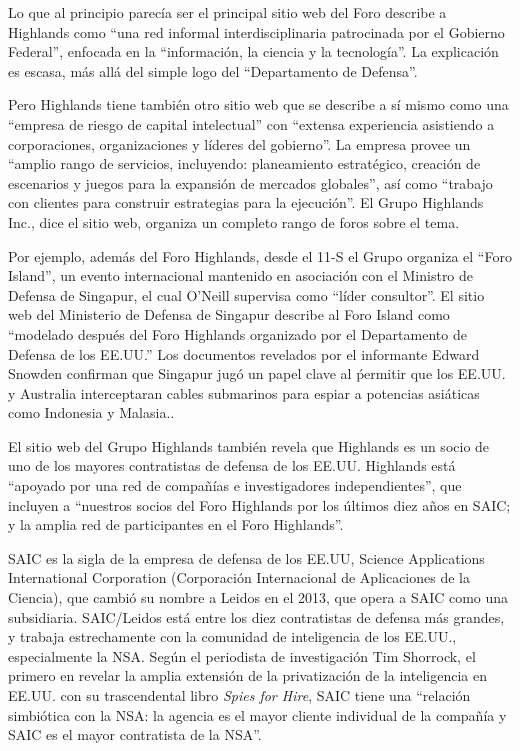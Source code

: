 \documentclass[10pt,a5paper,twoside,spanish,]{book}
\begin{document}
Lo que al principio parecía ser el principal sitio web del Foro describe
a Highlands como ``una red informal interdisciplinaria patrocinada por
el Gobierno Federal'', enfocada en la ``información, la ciencia y la
tecnología''. La explicación es escasa, más allá del simple logo del
``Departamento de Defensa''.

Pero Highlands tiene también otro sitio web que se describe a sí mismo
como una ``empresa de riesgo de capital intelectual'' con ``extensa
experiencia asistiendo a corporaciones, organizaciones y líderes del
gobierno''. La empresa provee un ``amplio rango de servicios,
incluyendo: planeamiento estratégico, creación de escenarios y juegos
para la expansión de mercados globales'', así como ``trabajo con
clientes para construir estrategias para la ejecución''. El Grupo
Highlands Inc., dice el sitio web, organiza un completo rango de foros
sobre el tema.

Por ejemplo, además del Foro Highlands, desde el 11-S el Grupo organiza
el ``Foro Island'', un evento internacional mantenido en asociación con
el Ministro de Defensa de Singapur, el cual O'Neill supervisa como
``líder consultor''. El sitio web del Ministerio de Defensa de Singapur
describe al Foro Island como ``modelado después del Foro Highlands
organizado por el Departamento de Defensa de los EE.UU.'' Los documentos
revelados por el informante Edward Snowden confirman que Singapur jugó
un papel clave al ṕermitir que los EE.UU. y Australia interceptaran
cables submarinos para espiar a potencias asiáticas como Indonesia y
Malasia..

El sitio web del Grupo Highlands también revela que Highlands es un
socio de uno de los mayores contratistas de defensa de los EE.UU.
Highlands está ``apoyado por una red de compañías e investigadores
independientes'', que incluyen a ``nuestros socios del Foro Highlands
por los últimos diez años en SAIC; y la amplia red de participantes en
el Foro Highlands''.

SAIC es la sigla de la empresa de defensa de los EE.UU, Science
Applications International Corporation (Corporación Internacional de
Aplicaciones de la Ciencia), que cambió su nombre a Leidos en el 2013,
que opera a SAIC como una subsidiaria. SAIC/Leidos está entre los diez
contratistas de defensa más grandes, y trabaja estrechamente con la
comunidad de inteligencia de los EE.UU., especialmente la NSA. Según el
periodista de investigación Tim Shorrock, el primero en revelar la
amplia extensión de la privatización de la inteligencia en EE.UU. con su
trascendental libro \emph{Spies for Hire}, SAIC tiene una ``relación
simbiótica con la NSA: la agencia es el mayor cliente individual de la
compañía y SAIC es el mayor contratista de la NSA''.
\end{document}
